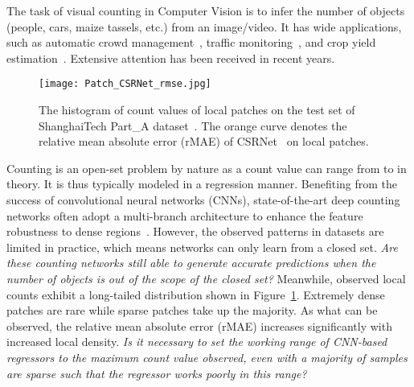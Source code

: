 \documentclass[10pt,twocolumn,letterpaper]{article}
\begin{document}
	The task of visual counting in Computer Vision is to infer the number of objects (people, cars, maize tassels, etc.) from an image/video. It has wide applications, such as automatic crowd management~\cite{UCFCC50_2013_CVPR,Compose_Loss_2018_ECCV,blobs_2018_ECCV,Zhang_2015_CVPR,MCNN_2016_CVPR}, traffic monitoring~\cite{TRANCOSdataset_IbPRIA2015,O2016Towards_CCNN}, and crop yield estimation~\cite{Fernandezgallego2018Wheat,Giuffrida2015Learning_global,Lu2017TasselNet}. Extensive attention has been received in recent years.
	
	\begin{figure}[t]
		\begin{center}
\texttt{[image: Patch\_CSRNet\_rmse.jpg]}
		\end{center}
		\vspace{-10pt}
		\caption{ The histogram of count values of  local patches on the test set of ShanghaiTech Part\_A dataset~\cite{MCNN_2016_CVPR}. The orange curve denotes the relative mean absolute error (rMAE) of CSRNet~\cite{CSRNet_2018_CVPR} on local patches. }
\label{fig:image_dis_rmae}
		\vspace{-10pt}
	\end{figure}
	
	Counting is an open-set problem by nature as a count value can range from  to  in theory. It is thus typically modeled in a regression manner. Benefiting from the success of convolutional neural networks (CNNs), state-of-the-art deep counting networks
often adopt a multi-branch architecture to enhance the feature robustness to dense regions~\cite{SwitchCNN_2017_CVPR,SANet_2018_ECCV,MCNN_2016_CVPR}. 
However, the observed patterns in datasets are limited in practice, which means networks can only learn from a closed set. \emph{Are these counting networks still able to generate accurate predictions when the number of objects is out of the scope of the closed set?}
	Meanwhile, observed local counts exhibit a long-tailed distribution shown in Figure~\ref{fig:image_dis_rmae}. Extremely dense patches are rare while sparse patches take up the majority. As what can be observed, the relative mean absolute error (rMAE) increases significantly with increased local density. \emph{Is it necessary to set the working range of CNN-based regressors to the maximum count value observed, even with a majority of samples are sparse such that the regressor works poorly in this range?}
	
\end{document}
